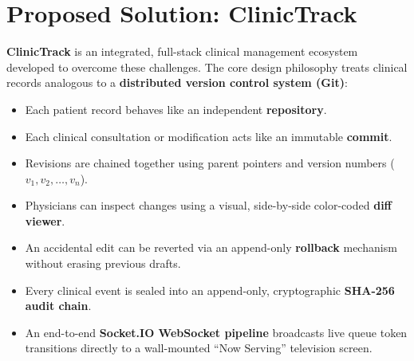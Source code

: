 \documentclass[12pt,a4paper,oneside]{report}
\begin{document}
\section{Proposed Solution: ClinicTrack}
\textbf{ClinicTrack} is an integrated, full-stack clinical management ecosystem developed to overcome these challenges. The core design philosophy treats clinical records analogous to a \textbf{distributed version control system (Git)}:
\begin{itemize}
    \item Each patient record behaves like an independent \textbf{repository}.
    \item Each clinical consultation or modification acts like an immutable \textbf{commit}.
    \item Revisions are chained together using parent pointers and version numbers ($v_1, v_2, \dots, v_n$).
    \item Physicians can inspect changes using a visual, side-by-side color-coded \textbf{diff viewer}.
    \item An accidental edit can be reverted via an append-only \textbf{rollback} mechanism without erasing previous drafts.
    \item Every clinical event is sealed into an append-only, cryptographic \textbf{SHA-256 audit chain}.
    \item An end-to-end \textbf{Socket.IO WebSocket pipeline} broadcasts live queue token transitions directly to a wall-mounted ``Now Serving'' television screen.
\end{itemize}
\end{document}
